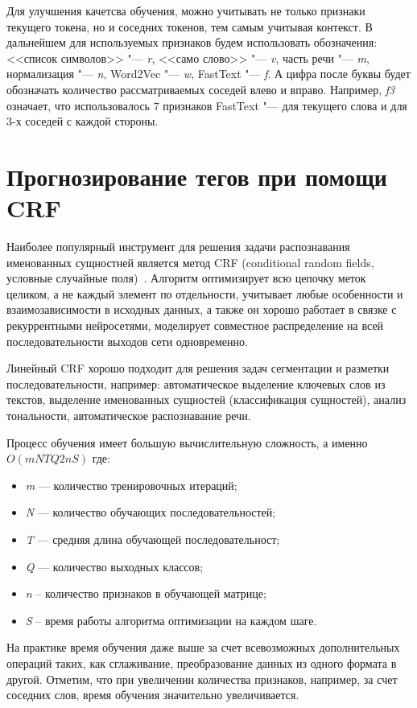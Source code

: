 \documentclass{csmathnotes}
\begin{document}
Для улучшения качетсва обучения, можно учитывать не только признаки текущего токена, но и соседних токенов, тем самым учитывая контекст.
В дальнейшем для используемых признаков будем использовать обозначения: <<список символов>> "--- \emph{r}, <<само слово>> "--- \emph{v}, часть речи "--- \emph{m}, нормализация "--- \emph{n}, Word2Vec "--- \emph{w}, FastText "--- \emph{f}.
А цифра после буквы будет обозначать количество рассматриваемых соседей влево и вправо.
Например, \emph{f3} означает, что использовалось $7$ признаков FastText "--- для текущего слова и для 3-х соседей с каждой стороны.

\section*{Прогнозирование тегов при помощи CRF}
Наиболее  популярный инструмент для решения задачи распознавания именованных сущностней является метод CRF (conditional random fields, условные случайные поля)~\cite{HabrCRF}. 
Алгоритм оптимизирует всю цепочку меток целиком, а не каждый элемент по отдельности, учитывает любые особенности и взаимозависимости в исходных данных, а также он хорошо работает в связке с рекуррентными нейросетями, моделирует совместное распределение на всей последовательности выходов сети одновременно.

Линейный CRF хорошо подходит для решения задач сегментации и разметки последовательности,
например: автоматическое выделение ключевых слов из текстов, выделение именованных сущностей (классификация сущностей), анализ тональности, автоматическое распознавание речи.


Процесс обучения имеет большую вычислительную сложность, а именно $O(mNTQ2nS)$ где:
\begin{itemize}
    \item \emph{m} — количество тренировочных итераций;
    \item \emph{N} — количество обучающих последовательностей;
    \item \emph{T} — средняя длина обучающей последовательност;
    \item \emph{Q} — количество выходных классов;
    \item \emph{n} – количество признаков в обучающей матрице;
    \item \emph{S} – время работы алгоритма оптимизации на каждом шаге. 
\end{itemize}


На практике время обучения даже выше за счет всевозможных дополнительных операций таких, как сглаживание, преобразование данных из одного формата в другой.
Отметим, что при увеличении количества признаков, например, за счет соседних слов, время обучения значительно увеличивается. 
\end{document}
